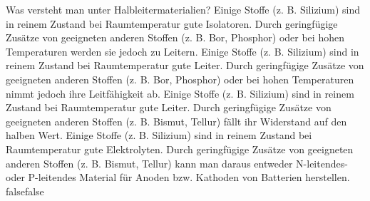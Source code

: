     {Was versteht man unter Halbleitermaterialien?}
    {Einige Stoffe (z. B. Silizium) sind in reinem Zustand bei Raumtemperatur gute Isolatoren. Durch geringfügige Zusätze von geeigneten anderen Stoffen (z. B. Bor, Phosphor) oder bei hohen Temperaturen werden sie jedoch zu Leitern.}
    {Einige Stoffe (z. B. Silizium) sind in reinem Zustand bei Raumtemperatur gute Leiter. Durch geringfügige Zusätze von geeigneten anderen Stoffen (z. B. Bor, Phosphor) oder bei hohen Temperaturen nimmt jedoch ihre Leitfähigkeit ab.}
    {Einige Stoffe (z. B. Silizium) sind in reinem Zustand bei Raumtemperatur gute Leiter. Durch geringfügige Zusätze von geeigneten anderen Stoffen (z. B. Bismut, Tellur) fällt ihr Widerstand auf den halben Wert.}
    {Einige Stoffe (z. B. Silizium) sind in reinem Zustand bei Raumtemperatur gute Elektrolyten. Durch geringfügige Zusätze von geeigneten anderen Stoffen (z. B. Bismut, Tellur) kann man daraus entweder N-leitendes- oder P-leitendes Material für Anoden bzw. Kathoden von Batterien herstellen.}
    {false}{false}